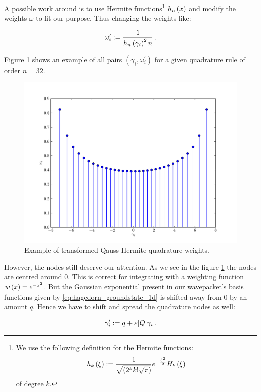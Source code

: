 A possible work around is to use Hermite functions\footnote{We use the following
definition for the Hermite functions:
\begin{equation}
  h_k\left( \xi \right) := \frac{1}{\sqrt{\left(2^k k! \sqrt{\pi}\right)}} e^{-\frac{\xi^2}{2}} H_k\left( \xi \right)
\end{equation}
of degree $k$.}
$h_n\left( x \right)$ and
modify the weights $\omega$ to fit our purpose. Thus changing the weights like:

\begin{equation}
  \omega_i^\prime := \frac{1}{h_{n}\left( \gamma_i \right)^2 n} \,.
\end{equation}

Figure \ref{fig:quadrature_nodes} shows an example of all pairs $\left(\gamma_i, \omega_i^\prime\right)$
for a given quadrature rule of order $n=32$.

\begin{figure}
  \centering
  \includegraphics[width=0.8\linewidth]{./figures/quadrature_nodes.pdf}
  \caption{Example of transformed Qauss-Hermite quadrature weights.}
  \label{fig:quadrature_nodes}
\end{figure}

However, the nodes still deserve our attention. As we see in the figure \ref{fig:quadrature_nodes}
the nodes are centred around $0$. This is correct for integrating with a weighting function
$w\left( x \right) = e^{-x^2}$. But the Gaussian exponential present in our wavepacket's basis functions
given by \eqref{eq:hagedorn_groundstate_1d} is shifted away from $0$ by an amount $q$.
Hence we have to shift and spread the quadrature nodes as well:

\begin{equation}
  \gamma_i^\prime := q + \varepsilon |Q| \gamma_i \,.
\end{equation}

